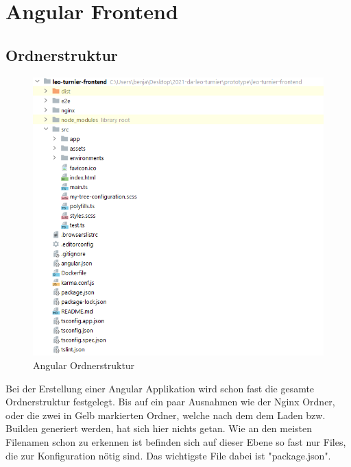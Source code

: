 \section{Angular Frontend}

\subsection{Ordnerstruktur}
\begin{figure}[H]
    \includegraphics[scale=0.8]{pics/frontend/angular_file_structure.PNG}
    \caption{Angular Ordnerstruktur}
\end{figure}

Bei der Erstellung einer Angular Applikation wird schon fast die gesamte Ordnerstruktur festgelegt. Bis auf ein paar Ausnahmen wie der Nginx Ordner, oder die zwei in Gelb markierten Ordner,
welche nach dem dem Laden bzw. Builden generiert werden, hat sich hier nichts getan.
Wie an den meisten Filenamen schon zu erkennen ist befinden sich auf dieser Ebene so fast nur Files, die zur Konfiguration nötig sind. Das wichtigste File dabei ist "package.json".

